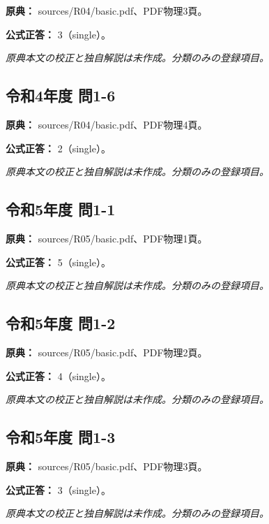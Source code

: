 \noindent\textbf{原典：} sources/R04/basic.pdf、PDF物理3頁。

\textbf{公式正答：} 3（single）。

\par\textit{原典本文の校正と独自解説は未作成。分類のみの登録項目。}

\subsection{令和4年度 問1-6}
\label{q:r04-reg-basic-1-6}

\noindent\textbf{原典：} sources/R04/basic.pdf、PDF物理4頁。

\textbf{公式正答：} 2（single）。

\par\textit{原典本文の校正と独自解説は未作成。分類のみの登録項目。}

\subsection{令和5年度 問1-1}
\label{q:r05-reg-basic-1-1}

\noindent\textbf{原典：} sources/R05/basic.pdf、PDF物理1頁。

\textbf{公式正答：} 5（single）。

\par\textit{原典本文の校正と独自解説は未作成。分類のみの登録項目。}

\subsection{令和5年度 問1-2}
\label{q:r05-reg-basic-1-2}

\noindent\textbf{原典：} sources/R05/basic.pdf、PDF物理2頁。

\textbf{公式正答：} 4（single）。

\par\textit{原典本文の校正と独自解説は未作成。分類のみの登録項目。}

\subsection{令和5年度 問1-3}
\label{q:r05-reg-basic-1-3}

\noindent\textbf{原典：} sources/R05/basic.pdf、PDF物理3頁。

\textbf{公式正答：} 3（single）。

\par\textit{原典本文の校正と独自解説は未作成。分類のみの登録項目。}

